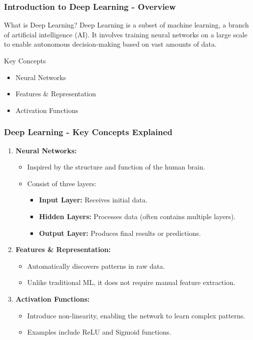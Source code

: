 \documentclass[aspectratio=169]{beamer}
\begin{document}
\frame{\titlepage}

\begin{frame}[fragile]
    \frametitle{Introduction to Deep Learning - Overview}
    \begin{block}{What is Deep Learning?}
        Deep Learning is a subset of machine learning, a branch of artificial intelligence (AI). It involves training neural networks on a large scale to enable autonomous decision-making based on vast amounts of data.
    \end{block}
    
    \begin{block}{Key Concepts}
        \begin{itemize}
            \item Neural Networks
            \item Features \& Representation
            \item Activation Functions
        \end{itemize}
    \end{block}
\end{frame}

\begin{frame}[fragile]
    \frametitle{Deep Learning - Key Concepts Explained}
    \begin{enumerate}
        \item \textbf{Neural Networks:}
            \begin{itemize}
                \item Inspired by the structure and function of the human brain.
                \item Consist of three layers:
                    \begin{itemize}
                        \item \textbf{Input Layer:} Receives initial data.
                        \item \textbf{Hidden Layers:} Processes data (often contains multiple layers).
                        \item \textbf{Output Layer:} Produces final results or predictions.
                    \end{itemize}
            \end{itemize}
        \item \textbf{Features \& Representation:}
            \begin{itemize}
                \item Automatically discovers patterns in raw data.
                \item Unlike traditional ML, it does not require manual feature extraction.
            \end{itemize}
        \item \textbf{Activation Functions:}
            \begin{itemize}
                \item Introduce non-linearity, enabling the network to learn complex patterns.
                \item Examples include ReLU and Sigmoid functions.
            \end{itemize}
    \end{enumerate}
\end{frame}
\end{document}
